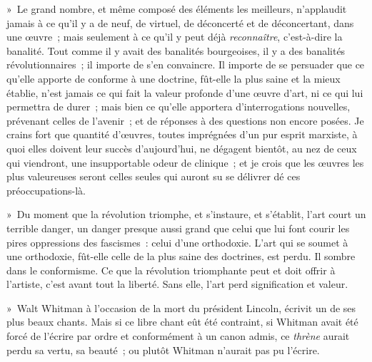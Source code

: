 \documentclass[french,twoside]{book} %
\begin{document}
\noindent » Le grand nombre, et même composé des éléments les meilleurs, n’applaudit jamais à ce qu’il y a de neuf, de virtuel, de déconcerté et de déconcertant, dans une œuvre ; mais seulement à ce qu’il y peut déjà \emph{reconnaître}, c’est-à-dire la banalité. Tout comme il y avait des banalités bourgeoises, il y a des banalités révolutionnaires ; il importe de s’en convaincre. Il importe de se persuader que ce qu’elle apporte de conforme à une doctrine, fût-elle la plus saine et la mieux établie, n’est jamais ce qui fait la valeur profonde d’une œuvre d’art, ni ce qui lui permettra de durer ; mais bien ce qu’elle apportera d’interrogations nouvelles, prévenant celles de l’avenir ; et de réponses à des questions non encore posées. Je crains fort que quantité d’œuvres, toutes imprégnées d’un pur esprit marxiste, à quoi elles doivent leur succès d’aujourd’hui, ne dégagent bientôt, au nez de ceux qui viendront, une insupportable odeur de clinique ; et je crois que les œuvres les plus valeureuses seront celles seules qui auront su se délivrer dé ces préoccupations-là.\par
» Du moment que la révolution triomphe, et s’instaure, et s’établit, l’art court un terrible danger, un danger presque aussi grand que celui que lui font courir les pires oppressions des fascismes : celui d’une orthodoxie. L’art qui se soumet à une orthodoxie, fût-elle celle de la plus saine des doctrines, est perdu. Il sombre dans le conformisme. Ce que la révolution triomphante peut et doit offrir à l’artiste, c’est avant tout la liberté. Sans elle, l’art perd signification et valeur.\par
» Walt Whitman à l’occasion de la mort du président Lincoln, écrivit un de ses plus beaux chants. Mais si ce libre chant eût été contraint, si Whitman avait été forcé de l’écrire par ordre et conformément à un canon admis, ce \emph{thrène} aurait perdu sa vertu, sa beauté ; ou plutôt Whitman n’aurait pas pu l’écrire.\par
\end{document}
